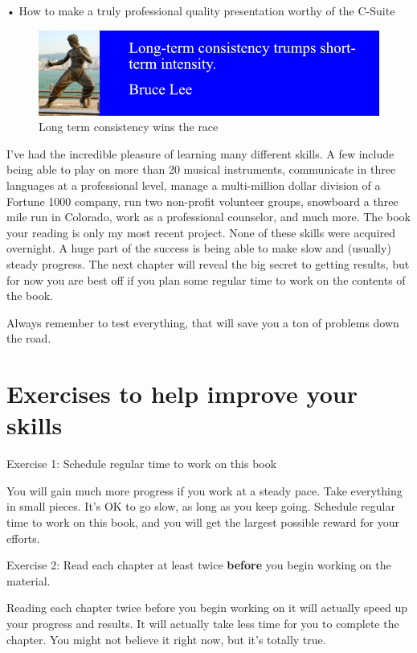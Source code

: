 \documentclass[
]{book}
\begin{document}
• How to make a truly professional quality presentation worthy of the C-Suite

\begin{figure}
\centering
\includegraphics{_book/images/Bruce_Lee.jpg}
\caption{Long term consistency wins the race}
\end{figure}

I've had the incredible pleasure of learning many different skills. A few include being able to play on more than 20 musical instruments, communicate in three languages at a professional level, manage a multi-million dollar division of a Fortune 1000 company, run two non-profit volunteer groups, snowboard a three mile run in Colorado, work as a professional counselor, and much more. The book your reading is only my most recent project. None of these skills were acquired overnight. A huge part of the success is being able to make slow and (usually) steady progress. The next chapter will reveal the big secret to getting results, but for now you are best off if you plan some regular time to work on the contents of the book.

Always remember to test everything, that will save you a ton of problems down the road.

\section{Exercises to help improve your skills}\label{exercises-to-help-improve-your-skills}

Exercise 1: Schedule regular time to work on this book

You will gain much more progress if you work at a steady pace. Take everything in small pieces. It's OK to go slow, as long as you keep going. Schedule regular time to work on this book, and you will get the largest possible reward for your efforts.

Exercise 2: Read each chapter at least twice \textbf{before} you begin working on the material.

Reading each chapter twice before you begin working on it will actually speed up your progress and results. It will actually take less time for you to complete the chapter. You might not believe it right now, but it's totally true.
\end{document}
